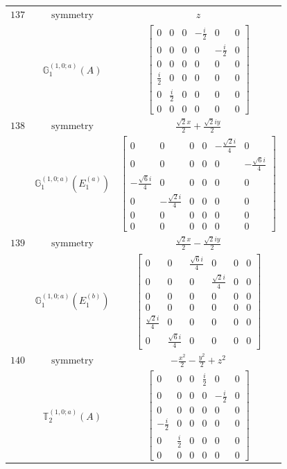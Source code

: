 \documentclass[fleqn,8pt,landscape]{jsarticle}
\begin{document}
\begin{longtable}{ccc}
$ 137 $ & $ \text{symmetry} $ & $ z $ \\
$  $ & $ \mathbb{G}_{1}^{(1,0;a)}(A) $ & $ \begin{bmatrix} 0 & 0 & 0 & - \frac{i}{2} & 0 & 0 \\ 0 & 0 & 0 & 0 & - \frac{i}{2} & 0 \\ 0 & 0 & 0 & 0 & 0 & 0 \\ \frac{i}{2} & 0 & 0 & 0 & 0 & 0 \\ 0 & \frac{i}{2} & 0 & 0 & 0 & 0 \\ 0 & 0 & 0 & 0 & 0 & 0 \end{bmatrix} $ \\ \hline
$ 138 $ & $ \text{symmetry} $ & $ \frac{\sqrt{2} x}{2} + \frac{\sqrt{2} i y}{2} $ \\
$  $ & $ \mathbb{G}_{1}^{(1,0;a)}(E_{1}^{(a)}) $ & $ \begin{bmatrix} 0 & 0 & 0 & 0 & - \frac{\sqrt{2} i}{4} & 0 \\ 0 & 0 & 0 & 0 & 0 & - \frac{\sqrt{6} i}{4} \\ - \frac{\sqrt{6} i}{4} & 0 & 0 & 0 & 0 & 0 \\ 0 & - \frac{\sqrt{2} i}{4} & 0 & 0 & 0 & 0 \\ 0 & 0 & 0 & 0 & 0 & 0 \\ 0 & 0 & 0 & 0 & 0 & 0 \end{bmatrix} $ \\ \hline
$ 139 $ & $ \text{symmetry} $ & $ \frac{\sqrt{2} x}{2} - \frac{\sqrt{2} i y}{2} $ \\
$  $ & $ \mathbb{G}_{1}^{(1,0;a)}(E_{1}^{(b)}) $ & $ \begin{bmatrix} 0 & 0 & \frac{\sqrt{6} i}{4} & 0 & 0 & 0 \\ 0 & 0 & 0 & \frac{\sqrt{2} i}{4} & 0 & 0 \\ 0 & 0 & 0 & 0 & 0 & 0 \\ 0 & 0 & 0 & 0 & 0 & 0 \\ \frac{\sqrt{2} i}{4} & 0 & 0 & 0 & 0 & 0 \\ 0 & \frac{\sqrt{6} i}{4} & 0 & 0 & 0 & 0 \end{bmatrix} $ \\ \hline
$ 140 $ & $ \text{symmetry} $ & $ - \frac{x^{2}}{2} - \frac{y^{2}}{2} + z^{2} $ \\
$  $ & $ \mathbb{T}_{2}^{(1,0;a)}(A) $ & $ \begin{bmatrix} 0 & 0 & 0 & \frac{i}{2} & 0 & 0 \\ 0 & 0 & 0 & 0 & - \frac{i}{2} & 0 \\ 0 & 0 & 0 & 0 & 0 & 0 \\ - \frac{i}{2} & 0 & 0 & 0 & 0 & 0 \\ 0 & \frac{i}{2} & 0 & 0 & 0 & 0 \\ 0 & 0 & 0 & 0 & 0 & 0 \end{bmatrix} $ \\ \hline

\end{longtable}
\end{document}
